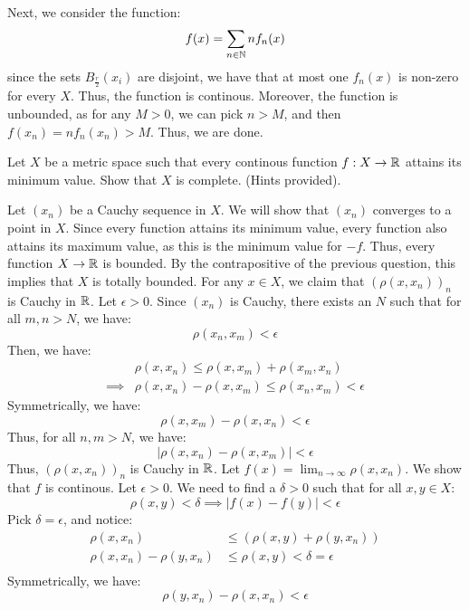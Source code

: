 \documentclass[12pt]{article}
\begin{document}
\begin{solution}
    Next, we consider the function: 
    \[f(x) = \sum_{n \in \mathbb N} nf_n(x)\]
    since the sets $B_{\frac r2}(x_i)$ are disjoint, we have that at most one $f_n(x)$ is non-zero for every $X$. Thus, the function is continous. Moreover, the function is unbounded, as for any $M > 0$, we can pick $n > M$, and then $f(x_n) = nf_n(x_n) > M$. Thus, we are done.
\end{solution}
\newpage

\begin{problem}{7}
    Let $X$ be a metric space such that every continous function $f: X \to \mathbb R$ attains its minimum value. Show that $X$ is complete. (Hints provided).
\end{problem}

\begin{solution}
    Let $(x_n)$ be a Cauchy sequence in $X$. We will show that $(x_n)$ converges to a point in $X$. \bbni
    Since every function attains its minimum value, every function also attains its maximum value, as this is the minimum value for $-f$. Thus, every function $X \to \mathbb R$ is bounded. By the contrapositive of the previous question, this implies that $X$ is totally bounded. \bbni
    For any $x \in X$, we claim that $(\rho(x, x_n))_n$ is Cauchy in $\mathbb R$. Let $\epsilon > 0$. Since $(x_n)$ is Cauchy, there exists an $N$ such that for all $m, n > N$, we have: 
    \[ \rho(x_n, x_m) < \epsilon\]
    Then, we have:
    \begin{align*}
       &\rho(x, x_n) \leq \rho(x, x_m) + \rho(x_m, x_n) \\
       \implies &\rho(x, x_n) - \rho(x, x_m) \leq \rho(x_n, x_m) < \epsilon
    \end{align*}
    Symmetrically, we have:
    \[\rho(x, x_m) - \rho(x, x_n) < \epsilon\]
    Thus, for all $n, m > N$, we have:
    \[|\rho(x, x_n) - \rho(x, x_m)| < \epsilon \]
    Thus, $(\rho(x, x_n))_n$ is Cauchy in $\mathbb R$. \bbni 
    Let $f(x) = \lim_{n \to \infty} \rho(x, x_n)$. We show that $f$ is continous. Let $\epsilon > 0$. We need to find a $\delta > 0$ such that for all $x, y \in X$: 
    \[\rho(x, y) < \delta \implies |f(x) - f(y)| < \epsilon \]
    Pick $\delta = \epsilon$, and notice:
    \begin{align*}
        \rho(x, x_n) &\leq (\rho(x, y) + \rho(y, x_n) ) \\ 
        \rho(x, x_n) - \rho(y, x_n) &\leq \rho(x, y) < \delta = \epsilon \\
    \end{align*}
    Symmetrically, we have:
    \[\rho(y, x_n) - \rho(x, x_n) < \epsilon \]

\end{solution}
\end{document}
